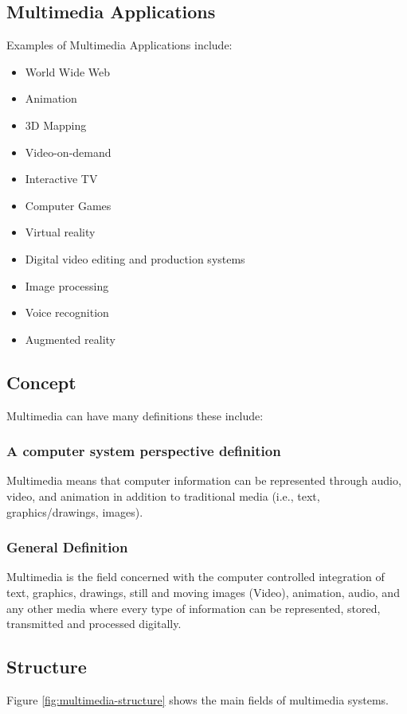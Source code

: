\subsection*{Multimedia Applications}
Examples of Multimedia Applications include:

\begin{multicols}{2}
\begin{itemize}
	\item World Wide Web
	\item Animation
	\item 3D Mapping
	\item Video-on-demand
	\item Interactive TV
	\item Computer Games
	\item Virtual reality
	\item Digital video editing and production systems
	\item Image processing
	\item Voice recognition
	\item Augmented reality
\end{itemize}
\end{multicols}
\subsection{Concept}
Multimedia can have many definitions these include:

\subsubsection*{A computer system perspective definition}
Multimedia means that computer information can be
represented through audio, video, and animation in addition to
traditional media (i.e., text, graphics/drawings, images).


\subsubsection*{General Definition}
Multimedia is the field concerned with the computer
controlled integration of text, graphics, drawings, still and
moving images (Video), animation, audio, and any other
media where every type of information can be represented,
stored, transmitted and processed digitally.

\subsection{Structure}
Figure {\ref{fig:multimedia-structure}} shows the main fields of multimedia systems.

